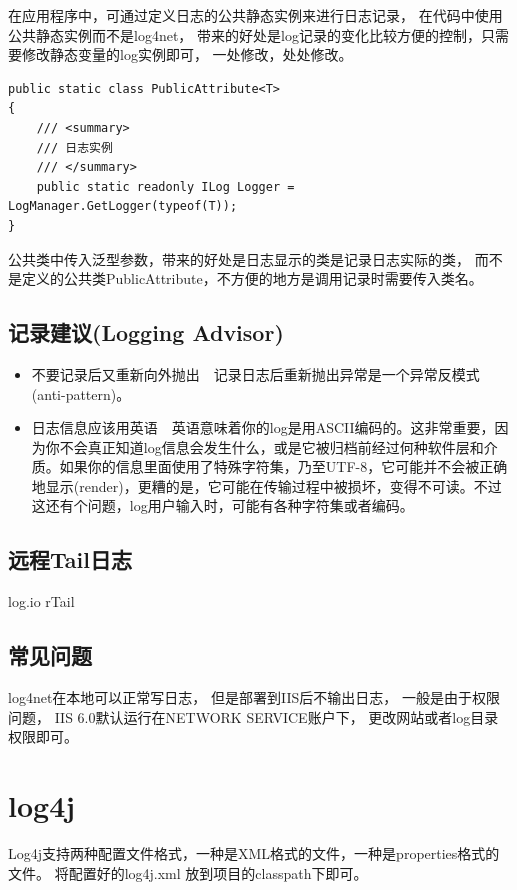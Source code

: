 \documentclass{book}
\begin{document}
在应用程序中，可通过定义日志的公共静态实例来进行日志记录，
在代码中使用公共静态实例而不是log4net，
带来的好处是log记录的变化比较方便的控制，只需要修改静态变量的log实例即可，
一处修改，处处修改。

\begin{lstlisting}[language={[Sharp]C}]
public static class PublicAttribute<T>
{
    /// <summary>
    /// 日志实例
    /// </summary>
    public static readonly ILog Logger = LogManager.GetLogger(typeof(T));
}
\end{lstlisting}

公共类中传入泛型参数，带来的好处是日志显示的类是记录日志实际的类，
而不是定义的公共类PublicAttribute，不方便的地方是调用记录时需要传入类名。

\subsection{记录建议(Logging Advisor)}

\begin{itemize}
	\item{不要记录后又重新向外抛出}~~记录日志后重新抛出异常是一个异常反模式(anti-pattern)。
	\item{日志信息应该用英语}~~英语意味着你的log是用ASCII编码的。这非常重要，因为你不会真正知道log信息会发生什么，或是它被归档前经过何种软件层和介质。如果你的信息里面使用了特殊字符集，乃至UTF-8，它可能并不会被正确地显示(render)，更糟的是，它可能在传输过程中被损坏，变得不可读。不过这还有个问题，log用户输入时，可能有各种字符集或者编码。
\end{itemize}

\subsection{远程Tail日志}

log.io rTail

\subsection{常见问题}

log4net在本地可以正常写日志，
但是部署到IIS后不输出日志，
一般是由于权限问题，
IIS 6.0默认运行在NETWORK SERVICE账户下，
更改网站或者log目录权限即可。

\section{log4j}

Log4j支持两种配置文件格式，一种是XML格式的文件，一种是properties格式的文件。
将配置好的log4j.xml 放到项目的classpath下即可。
\end{document}
